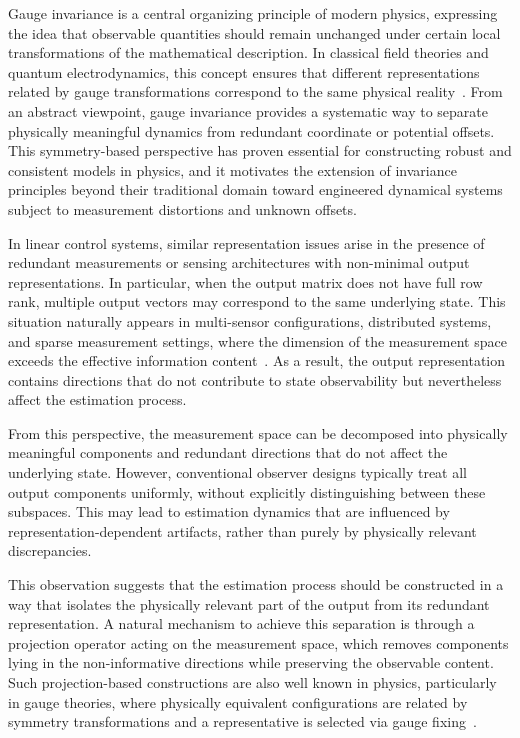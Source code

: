\documentclass[pdflatex,sn-mathphys-num]{sn-jnl}%
\theoremstyle{thmstyleone}%
\theoremstyle{thmstyletwo}%
\theoremstyle{thmstylethree}%
\begin{document}
Gauge invariance is a central organizing principle of modern physics, expressing the idea that observable quantities should remain unchanged under certain local transformations of the mathematical description. In classical field theories and quantum electrodynamics, this concept ensures that different representations related by gauge transformations correspond to the same physical reality~\cite{Peskin1995,YangMills1954}. From an abstract viewpoint, gauge invariance provides a systematic way to separate physically meaningful dynamics from redundant coordinate or potential offsets. This symmetry-based perspective has proven essential for constructing robust and consistent models in physics, and it motivates the extension of invariance principles beyond their traditional domain toward engineered dynamical systems subject to measurement distortions and unknown offsets.

In linear control systems, similar representation issues arise in the presence of redundant measurements or sensing architectures with non-minimal output representations. In particular, when the output matrix does not have full row rank, multiple output vectors may correspond to the same underlying state. This situation naturally appears in multi-sensor configurations, distributed systems, and sparse measurement settings, where the dimension of the measurement space exceeds the effective information content~\cite{Chen1999,Kailath1980}. As a result, the output representation contains directions that do not contribute to state observability but nevertheless affect the estimation process.

From this perspective, the measurement space can be decomposed into physically meaningful components and redundant directions that do not affect the underlying state. However, conventional observer designs typically treat all output components uniformly, without explicitly distinguishing between these subspaces. This may lead to estimation dynamics that are influenced by representation-dependent artifacts, rather than purely by physically relevant discrepancies.

This observation suggests that the estimation process should be constructed in a way that isolates the physically relevant part of the output from its redundant representation. A natural mechanism to achieve this separation is through a projection operator acting on the measurement space, which removes components lying in the non-informative directions while preserving the observable content. Such projection-based constructions are also well known in physics, particularly in gauge theories, where physically equivalent configurations are related by symmetry transformations and a representative is selected via gauge fixing~\cite{Peskin1995}.
\end{document}
